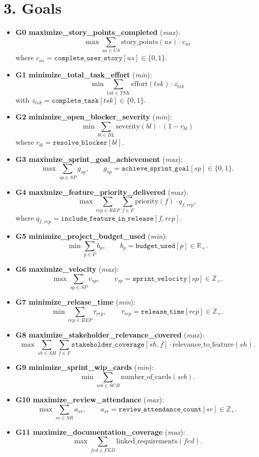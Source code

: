 \documentclass[11pt]{article}
\begin{document}
\section{3. Goals}
\begin{itemize}
  \item \textbf{G0 maximize\_story\_points\_completed} (\textit{max}): 
  \[
    \max \sum_{us\in US} \text{story\_points}(us)\cdot c_{us}
  \]
  where $c_{us}=\texttt{complete\_user\_story}[us]\in\{0,1\}$.

  \item \textbf{G1 minimize\_total\_task\_effort} (\textit{min}):
  \[
    \min \sum_{tsk\in TSK}\text{effort}(tsk)\cdot z_{tsk}
  \]
  with $z_{tsk}=\texttt{complete\_task}[tsk]\in\{0,1\}$.

  \item \textbf{G2 minimize\_open\_blocker\_severity} (\textit{min}):
  \[
    \min \sum_{bl\in BL}\text{severity}(bl)\cdot (1-r_{bl})
  \]
  where $r_{bl}=\texttt{resolve\_blocker}[bl]$.

  \item \textbf{G3 maximize\_sprint\_goal\_achievement} (\textit{max}):
  \[
    \max \sum_{sp\in SP} g_{sp},\qquad g_{sp}=\texttt{achieve\_sprint\_goal}[sp]\in\{0,1\}.
  \]

  \item \textbf{G4 maximize\_feature\_priority\_delivered} (\textit{max}):
  \[
    \max \sum_{rep\in REP}\sum_{f\in F} \text{priority}(f)\cdot q_{f,rep},
  \]
  where $q_{f,rep}=\texttt{include\_feature\_in\_release}[f,rep]$.

  \item \textbf{G5 minimize\_project\_budget\_used} (\textit{min}):
  \[
    \min \sum_{p\in P} b_p,\qquad b_p=\texttt{budget\_used}[p]\in\mathbb{R}_+.
  \]

  \item \textbf{G6 maximize\_velocity} (\textit{max}):
  \[
    \max \sum_{sp\in SP} v_{sp},\qquad v_{sp}=\texttt{sprint\_velocity}[sp]\in\mathbb{Z}_+.
  \]

  \item \textbf{G7 minimize\_release\_time} (\textit{min}):
  \[
    \min \sum_{rep\in REP} \tau_{rep},\qquad \tau_{rep}=\texttt{release\_time}[rep]\in\mathbb{Z}_+.
  \]

  \item \textbf{G8 maximize\_stakeholder\_relevance\_covered} (\textit{max}):
  \[
    \max \sum_{sh\in SH}\sum_{f\in F} \texttt{stakeholder\_coverage}[sh,f]\cdot \text{relevance\_to\_feature}(sh).
  \]

  \item \textbf{G9 minimize\_sprint\_wip\_cards} (\textit{min}):
  \[
    \min \sum_{scb\in SCB}\text{number\_of\_cards}(scb).
  \]

  \item \textbf{G10 maximize\_review\_attendance} (\textit{max}):
  \[
    \max \sum_{sr\in SR} a_{sr},\qquad a_{sr}=\texttt{review\_attendance\_count}[sr]\in\mathbb{Z}_+.
  \]

  \item \textbf{G11 maximize\_documentation\_coverage} (\textit{max}):
  \[
    \max \sum_{fed\in FED}\text{linked\_requirements}(fed).
  \]
\end{itemize}
\end{document}
